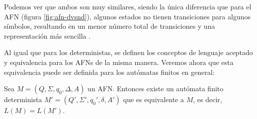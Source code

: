 \vspace{10pt}
Podemos ver que ambos son muy similares, siendo la única diferencia que para el AFN (figura \ref{fig:afn-dvsnd}), 
algunos estados no tienen transiciones para algunos símbolos, resultando en un menor número total de transiciones y 
una representación más sencilla \cite{chakraborty_2003}.

\vspace{10pt}
Al igual que para los deterministas, se definen los conceptos de lenguaje aceptado y equivalencia para los AFNs de
la misma manera. Veremos ahora que esta equivalencia puede ser definida para los autómatas finitos en general:

\begin{teorema}Sea $M=(Q,\Sigma,q_0,\Delta,A)$ un AFN. Entonces existe un autómata finito determinista 
$M'=(Q',\Sigma',q_0',\delta,A')$ que es equivalente a $M$, es decir, $L(M)=L(M')$.\label{teo:afn-afd}
\end{teorema}
